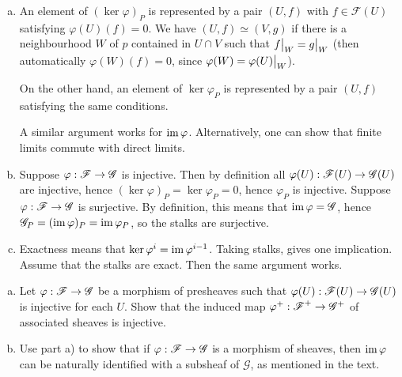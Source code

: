 \documentclass[11pt, english]{article}
\begin{document}
  \begin{sol}
    \begin{enumerate}[a)]
    \item An element of $(\ker \varphi)_P$ is represented by a pair $(U,f)$ with $f \in \mathscr F(U)$ satisfying $\varphi(U)(f)=0$. We have $(U,f) \simeq (V,g)$ if there is a neighbourhood $W$ of $p$ contained in $U \cap V$ such that $\restr{f}{W}=\restr{g}{W}$ (then automatically $\varphi(W)(f)=0$, since $\varphi(W)=\restr{\varphi(U)}{W}$).

On the other hand, an element of $\ker \varphi_P$ is represented by a pair $(U,f)$ satisfying the same conditions.

A similar argument works for $\operatorname{im} \varphi$. Alternatively, one can show that finite limits commute with direct limits. 
\item Suppose $\varphi:\operatorname{\mathscr{F}} \to \mathscr G$ is injective. Then by definition all $\varphi(U):\operatorname{\mathscr{F}}(U) \to \mathscr G(U)$ are injective, hence $(\ker \varphi)_P=\ker \varphi_P=0$, hence $\varphi_P$ is injective. Suppose $\varphi:\operatorname{\mathscr{F}} \to \mathscr G$ is surjective. By definition, this means that $\operatorname{im} \varphi=\mathscr G$, hence $\mathscr G_P = (\operatorname{im} \varphi)_P = \operatorname{im} \varphi_P$, so the stalks are surjective. 
\item Exactness means that $\ker \varphi^i = \operatorname{im} \varphi^{i-1}$. Taking stalks, gives one implication. Assume that the stalks are exact. Then the same argument works.
    \end{enumerate}
  \end{sol}

  \begin{exc}
    \begin{enumerate}[a)]
    \item Let $\varphi:\operatorname{\mathscr{F}} \to \mathscr G$ be a morphism of presheaves such that $\varphi(U):\operatorname{\mathscr{F}}(U) \to \mathscr G(U)$ is injective for each $U$. Show that the induced map $\varphi^+:\operatorname{\mathscr{F}}^+ \to \mathscr G^+$ of associated sheaves is injective.
\item Use part a) to show that if $\varphi:\operatorname{\mathscr{F}} \to \mathscr G$ is a morphism of sheaves, then $\operatorname{im} \varphi$ can be naturally identified with a subsheaf of $\mathscr G$, as mentioned in the text.
    \end{enumerate}
  \end{exc}
\end{document}
